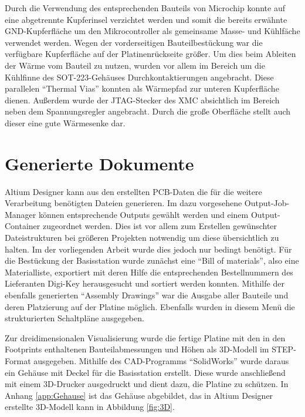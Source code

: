Durch die Verwendung des entsprechenden Bauteils von Microchip konnte auf eine abgetrennte Kupferinsel verzichtet werden und somit die bereits erwähnte \acs{GND}-Kupferfläche um den Mikrocontroller als gemeinsame Masse- und Kühlfäche verwendet werden.
Wegen der vorderseitigen Bauteilbestückung war die verfügbare Kupferfläche auf der Platinenrückseite  größer. Um dies beim Ableiten der Wärme vom Bauteil zu nutzen, wurden vor allem im Bereich um die Kühlfinne des \ac{SOT}-223-Gehäuses Durchkontaktierungen angebracht. Diese parallelen \enquote{Thermal Vias} konnten als Wärmepfad zur unteren Kupferfläche dienen. Außerdem wurde der \ac{JTAG}-Stecker des XMC absichtlich im Bereich neben dem Spannungsregler angebracht. Durch die große Oberfläche stellt auch dieser eine gute Wärmesenke dar. %





\section{Generierte Dokumente}
Altium Designer kann aus den erstellten \ac{PCB}-Daten die für die weitere Verarbeitung benötigten Dateien generieren. Im dazu vorgesehene Output-Job-Manager können entsprechende Outputs gewählt werden und einem Output-Container zugeordnet werden. Dies ist vor allem zum Erstellen gewünschter Dateistrukturen bei größeren Projekten notwendig um diese übersichtlich zu halten. Im der vorliegenden Arbeit wurde dies jedoch nur bedingt benötigt.
Für die Bestückung der Basisstation wurde zunächst eine \enquote{Bill of materials}, also eine Materialliste, exportiert mit deren Hilfe die entsprechenden Bestellnummern des Lieferanten Digi-Key herausgesucht und sortiert werden konnten. Mithilfe der ebenfalls generierten \enquote{Assembly Drawings} war die Ausgabe aller Bauteile und deren Platzierung auf der Platine möglich. Ebenfalls wurden in diesem Menü die strukturierten Schaltpläne ausgegeben.

Zur dreidimensionalen Visualisierung wurde die fertige Platine mit den in den Footprints enthaltenen Bauteilabmessungen und Höhen als 3D-Modell im \ac{STEP}-Format ausgegeben. Mithilfe des \ac{CAD}-Programms \enquote{SolidWorks} wurde daraus ein Gehäuse mit Deckel für die Basisstation erstellt. Diese wurde anschließend mit einem 3D-Drucker ausgedruckt und dient dazu, die Platine zu schützen. In Anhang \ref{app:Gehause} ist das Gehäuse abgebildet, das in Altium Designer erstellte 3D-Modell kann in Abbildung \ref{fig:3D}.

